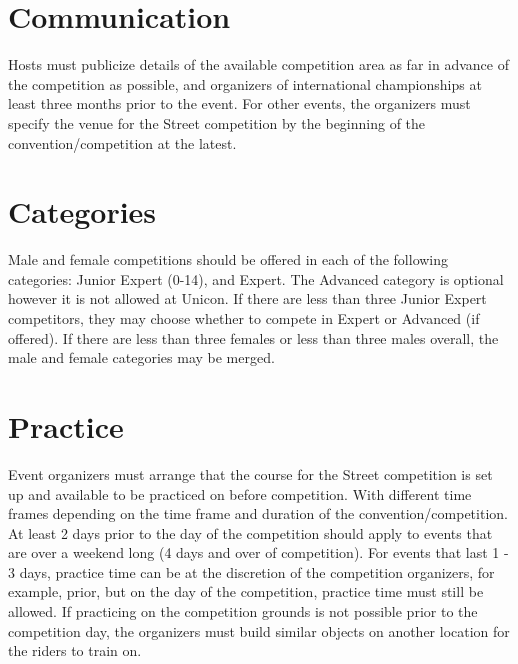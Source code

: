 \section{Communication}

Hosts must publicize details of the available competition area as far in advance of the competition as possible, and organizers of international championships at least three months prior to the event.
For other events, the organizers must specify the venue for the Street competition by the beginning of the convention/competition at the latest.

\section{Categories}
Male and female competitions should be offered in each of the following categories: Junior Expert (0-14), and Expert.
The Advanced category is optional however it is not allowed at Unicon.
If there are less than three Junior Expert competitors, they may choose whether to compete in Expert or Advanced (if offered).
If there are less than three females or less than three males overall, the male and female categories may be merged.

\section{Practice}

Event organizers must arrange that the course for the Street competition is set up and available to be practiced on before competition.
With different time frames depending on the time frame and duration of the convention/competition.
At least 2 days prior to the day of the competition should apply to events that are over a weekend long (4 days and over of competition).
For events that last 1 - 3 days, practice time can be at the discretion of the competition organizers, for example, prior, but on the day of the competition, practice time must still be allowed.
If practicing on the competition grounds is not possible prior to the competition day, the organizers must build similar objects on another location for the riders to train on.
